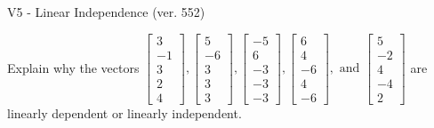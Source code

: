 \begin{exercise}
  \begin{exerciseTitle}V5 - Linear Independence (ver. 552)\end{exerciseTitle}
  \begin{exerciseStatement}
    Explain why the vectors \(\left[\begin{array}{r}
3 \\
-1 \\
3 \\
2 \\
4
\end{array}\right] , \left[\begin{array}{r}
5 \\
-6 \\
3 \\
3 \\
3
\end{array}\right] , \left[\begin{array}{r}
-5 \\
6 \\
-3 \\
-3 \\
-3
\end{array}\right] , \left[\begin{array}{r}
6 \\
4 \\
-6 \\
4 \\
-6
\end{array}\right] , \text{ and } \left[\begin{array}{r}
5 \\
-2 \\
4 \\
-4 \\
2
\end{array}\right]\) are linearly dependent or linearly independent.	



\end{exerciseStatement}
\end{exercise}
